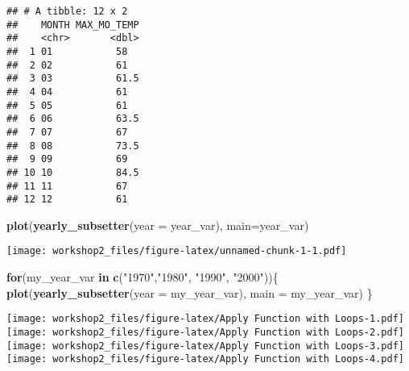 \documentclass[
]{article}
\newenvironment{Shaded}{\begin{snugshade}}{\end{snugshade}}
\newcommand{\AttributeTok}[1]{\textcolor[rgb]{0.13,0.29,0.53}{#1}}
\newcommand{\ControlFlowTok}[1]{\textcolor[rgb]{0.13,0.29,0.53}{\textbf{#1}}}
\newcommand{\FunctionTok}[1]{\textcolor[rgb]{0.13,0.29,0.53}{\textbf{#1}}}
\newcommand{\NormalTok}[1]{#1}
\newcommand{\StringTok}[1]{\textcolor[rgb]{0.31,0.60,0.02}{#1}}
\begin{document}
\begin{verbatim}
## # A tibble: 12 x 2
##    MONTH MAX_MO_TEMP
##    <chr>       <dbl>
##  1 01           58  
##  2 02           61  
##  3 03           61.5
##  4 04           61  
##  5 05           61  
##  6 06           63.5
##  7 07           67  
##  8 08           73.5
##  9 09           69  
## 10 10           84.5
## 11 11           67  
## 12 12           61
\end{verbatim}

\begin{Shaded}
\begin{Highlighting}[]
\FunctionTok{plot}\NormalTok{(}\FunctionTok{yearly\_subsetter}\NormalTok{(}\AttributeTok{year =}\NormalTok{ year\_var), }\AttributeTok{main=}\NormalTok{year\_var)}
\end{Highlighting}
\end{Shaded}

\texttt{[image: workshop2\_files/figure-latex/unnamed-chunk-1-1.pdf]}

\begin{Shaded}
\begin{Highlighting}[]
\ControlFlowTok{for}\NormalTok{(my\_year\_var }\ControlFlowTok{in} \FunctionTok{c}\NormalTok{(}\StringTok{"1970"}\NormalTok{,}\StringTok{"1980"}\NormalTok{, }\StringTok{"1990"}\NormalTok{, }\StringTok{"2000"}\NormalTok{))\{}
  \FunctionTok{plot}\NormalTok{(}\FunctionTok{yearly\_subsetter}\NormalTok{(}\AttributeTok{year =}\NormalTok{ my\_year\_var), }\AttributeTok{main =}\NormalTok{ my\_year\_var)}
\NormalTok{\}}
\end{Highlighting}
\end{Shaded}

\texttt{[image: workshop2\_files/figure-latex/Apply Function with Loops-1.pdf]}
\texttt{[image: workshop2\_files/figure-latex/Apply Function with Loops-2.pdf]}
\texttt{[image: workshop2\_files/figure-latex/Apply Function with Loops-3.pdf]}
\texttt{[image: workshop2\_files/figure-latex/Apply Function with Loops-4.pdf]}
\end{document}
